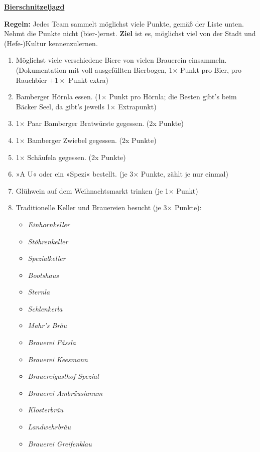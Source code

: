 \documentclass[a5paper,ngerman,xcolor=dvipsnames]{scrartcl}
\begin{document}
{%
\Huge
\begin{center}
\ul{\textbf{Bierschnitzeljagd}}
\end{center}
}%

\vspace{2em}

\noindent\textbf{Regeln:} Jedes Team sammelt möglichst viele Punkte, gemäß der Liste
unten. Nehmt die Punkte nicht (bier-)ernst. \textbf{Ziel} ist es, möglichst viel von der
Stadt und (Hefe-)Kultur kennenzulernen.

\begin{enumerate}
\setlength\itemsep{0.3em}
\item Möglichst viele verschiedene Biere von vielen Brauerein einsammeln. (Dokumentation mit voll ausgefüllten Bierbogen, 1$\times$ Punkt pro Bier, pro Rauchbier $+1\times$ Punkt extra)
\item Bamberger Hörnla essen. (1$\times$ Punkt pro Hörnla; die Besten gibt's beim Bäcker Seel, da gibt's jeweils 1$\times$ Extrapunkt)
\item 1$\times$ Paar Bamberger Bratwürste gegessen. (2x Punkte)
\item 1$\times$ Bamberger Zwiebel gegessen. (2x Punkte)
\item 1$\times$ Schäufela gegessen. (2x Punkte)
\item »A U« oder ein »Spezi« bestellt. (je 3$\times$ Punkte, zählt je nur einmal)
\item Glühwein auf dem Weihnachtsmarkt trinken (je 1$\times$ Punkt)
\item Traditionelle Keller und Brauereien besucht (je 3$\times$ Punkte):
    \begin{multicols}{2}
    \begin{itemize}
    \item \emph{Einhornkeller}
    \item \emph{Stöhrenkeller}
    \item \emph{Spezialkeller}
    \item \emph{Bootshaus}
    \item \emph{Sternla}
    \item \emph{Schlenkerla}
    \item \emph{Mahr's Bräu}
    \item \emph{Brauerei Fässla}
    \item \emph{Brauerei Keesmann}
    \item \emph{Brauereigasthof Spezial}
    \item \emph{Brauerei Ambräusianum}
    \item \emph{Klosterbräu}
    \item \emph{Landwehrbräu}
    \item \emph{Brauerei Greifenklau}
    \end{itemize}
    \end{multicols}


\end{enumerate}
\end{document}

